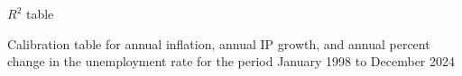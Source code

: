 \documentclass[11pt,a4paper]{article}
\newcommand{\resultsdate}{2026-06-26}
\newif\ifshowfigures
\begin{document}
%     

\begin{table}[htbp]
  \centering
  \resizebox{\textwidth}{!}{
  
  }
  \caption{$R^2$ table}
  \label{tab: baseline r2 table}
\end{table}


\begin{table}[htbp]
  \centering
  \resizebox{\textwidth}{!}{
  
  }
  \caption{Calibration table for annual inflation, annual IP growth, and annual percent change in the unemployment rate for the period January 1998 to December 2024}
  \label{tab: baseline calibration table}
\end{table}



\end{document}
